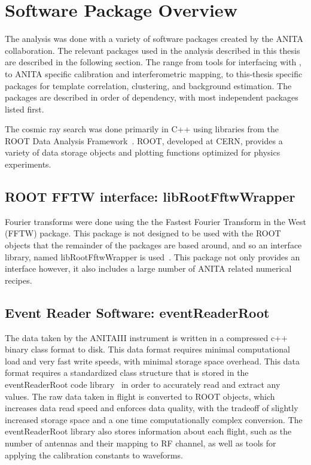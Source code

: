 \section{Software Package Overview}
	The analysis was done with a variety of software packages created by the ANITA collaboration.  The relevant packages used in the analysis described in this thesis are described in the following section.  The range from tools for interfacing with , to ANITA specific calibration and interferometric mapping, to this-thesis specific packages for template correlation, clustering, and background estimation.  The packages are described in order of dependency, with most independent packages listed first.
	
	The cosmic ray search was done primarily in C++ using libraries from the ROOT Data Analysis Framework~\cite{ROOT}.  ROOT, developed at CERN, provides a variety of data storage objects and plotting functions optimized for physics experiments.

	\subsection{ROOT FFTW interface: libRootFftwWrapper}
		Fourier transforms were done using the the Fastest Fourier Transform in the West (FFTW) package.  This package is not designed to be used with the ROOT objects that the remainder of the packages are based around, and so an interface library, named libRootFftwWrapper is used~\cite{libRootFftwWrapper}.  This package not only provides an interface however, it also includes a large number of ANITA related numerical recipes.

	\subsection{Event Reader Software: eventReaderRoot}
		The data taken by the ANITAIII instrument is written in a compressed c++ binary class format to disk.  This data format requires minimal computational load and very fast write speeds, with minimal storage space overhead.  This data format requires a standardized class structure that is stored in the eventReaderRoot code library~\cite{eventReaderRoot} in order to accurately read and extract any values.  The raw data taken in flight is converted to ROOT objects, which increases data read speed and enforces data quality, with the tradeoff of slightly increased storage space and a one time computationally complex conversion.  The eventReaderRoot library also stores information about each flight, such as the number of antennas and their mapping to RF channel, as well as tools for applying the calibration constants to waveforms.

